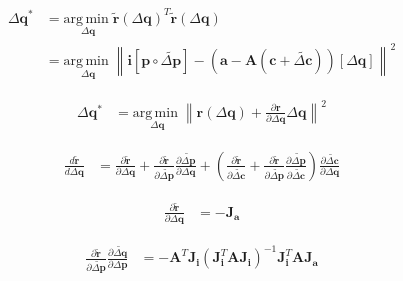 \begin{equation}
    \begin{aligned}
        \Delta\mathbf{q}^* & = \underset{\Delta\mathbf{q}}{\mathrm{arg\,min\;}} \tilde{\mathbf{r}}(\Delta\mathbf{q})^T \tilde{\mathbf{r}}(\Delta\mathbf{q})
        \\
        & = \underset{\Delta\mathbf{q}}{\mathrm{arg\,min\;}}  \left\| \mathbf{i}[\mathbf{p} \circ \tilde{\Delta \mathbf{p}}] - (\mathbf{a} - \mathbf{A}(\mathbf{c} + \tilde{\Delta \mathbf{c}}))[\Delta \mathbf{q}] \right\|^2
    \label{eq:ssd_appearance}
    \end{aligned}
\end{equation}

\begin{equation}
    \begin{aligned}
        \Delta\mathbf{q}^* & = \underset{\Delta\mathbf{q}}{\mathrm{arg\,min\;}}  \left\| \mathbf{r}(\Delta\mathbf{q}) + \frac{\partial\mathbf{r}}{\partial\Delta\mathbf{q}} \Delta\mathbf{q} \right\|^2
    \label{eq:ssd_appearance}
    \end{aligned}
\end{equation}

\begin{equation}
    \begin{aligned}
        \frac{d \tilde{\mathbf{r}}}{d \Delta \mathbf{q}} & = \frac{\partial \tilde{\mathbf{r}}}{\partial \Delta \mathbf{q}} + \frac{\partial \tilde{\mathbf{r}}}{\partial \tilde{\Delta \mathbf{p}}} \frac{\partial \tilde{\Delta \mathbf{p}}}{\partial \Delta \mathbf{q}} + \left( \frac{\partial\tilde{\mathbf{r}}}{\partial \tilde{\Delta \mathbf{c}}} + \frac{\partial \tilde{\mathbf{r}}}{\partial \tilde{\Delta \mathbf{p}}} \frac{\partial \tilde{\Delta \mathbf{p}}}{\partial \tilde{\Delta \mathbf{c}}} \right) \frac{\partial \tilde{\Delta \mathbf{c}}}{\partial \Delta \mathbf{q}}
    \label{eq:wiberg_appearance}
    \end{aligned}
\end{equation}

\begin{equation}
    \begin{aligned}
        \frac{\partial \tilde{\mathbf{r}}}{\partial \Delta \mathbf{q}} &= - \mathbf{J}_{\mathbf{a}}
    \label{eq:wiberg_inverse1}
    \end{aligned}
\end{equation}

\begin{equation}
    \begin{aligned}
        \frac{\partial \tilde{\mathbf{r}}}{\partial \tilde{\Delta \mathbf{p}}} \frac{\partial \tilde{\Delta \mathbf{q}}}{\partial \Delta \mathbf{p}} & = - \mathbf{A}^T \mathbf{J}_{\mathbf{i}} \left( \mathbf{J}_{\mathbf{i}}^T \mathbf{A} \mathbf{J}_{\mathbf{i}} \right)^{-1} \mathbf{J}_{\mathbf{i}}^T \mathbf{A} \mathbf{J}_{\mathbf{a}}
    \label{eq:wiberg_inverse2}
    \end{aligned}
\end{equation}

